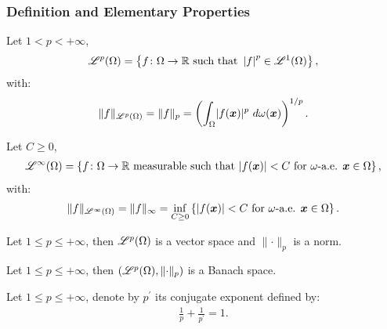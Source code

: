\subsubsection{Definition and Elementary Properties}

\begin{definition}
    Let $1 < p < +\infty$,
    \begin{align}
        \mathscr{L}^{p}(\Omega) = \left\{ f \colon \Omega \rightarrow \mathbb{R} \text{ such that } \left| f \right|^p \in \mathscr{L}^{1}(\Omega) \right\},
    \end{align}
    with:
    \begin{align}
    \lVert f \rVert_{\mathscr{L}^{p}(\Omega)} = \lVert f \rVert_{p} = \left( \int_{\Omega} \lvert f(\bm{x}) \rvert^p ~ d \omega(\bm{x}) \right)^{1/p}.
    \end{align}
\end{definition}

\begin{definition}[$\SpaceLp{\infty}(\Omega)$]
    Let $C \geq 0$,
    \begin{align}
        \mathscr{L}^{\infty}(\Omega) = \left\{ f \colon \Omega \rightarrow \mathbb{R} \text{ measurable such that } \lvert f(\bm{x}) \rvert < C \text{ for } \omega \text{-a.e. } \bm{x} \in \Omega \right\},
    \end{align}
    with:
    \begin{align}
    \lVert f \rVert_{\mathscr{L}^{\infty}(\Omega)} = \lVert f \rVert_{\infty} = \inf_{C \geq 0} \left\{ \lvert f(\bm{x}) \rvert < C \text{ for } \omega \text{-a.e. } \bm{x} \in \Omega \right\}.
    \end{align}
\end{definition}

\begin{theorem}
    Let $1 \leq p \leq +\infty$, then $\mathscr{L}^{p}(\Omega)$ is a vector space and $\lVert \cdot \rVert_p$ is a norm.
\end{theorem}

\begin{theorem}
    Let $1 \leq p \leq +\infty$, then $(\mathscr{L}^{p}(\Omega), \lVert \cdot \rVert_p)$ is a Banach space.
\end{theorem}

\begin{definition}
    Let $1 \leq p \leq +\infty$, denote by $p^{\prime}$ its conjugate exponent defined by:
    \begin{align}
        \frac{1}{p} + \frac{1}{p^{\prime}} = 1.
    \end{align}
\end{definition}

